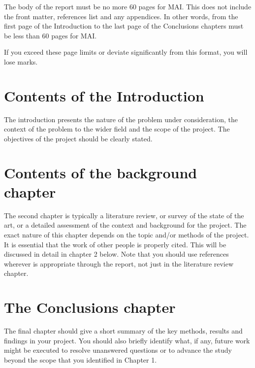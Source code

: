 The body of the report must be no more 60 pages for MAI. This does not include the front matter, references list and any appendices. In other words, from the first page of the Introduction to the last page of the Conclusions chapters must be less than 60 pages for MAI.

If you exceed these page limits or deviate significantly from this format, you will lose marks.

\section{Contents of the Introduction}
The introduction presents the nature of the problem under consideration, the context of the problem to the wider field and the scope of the project. The objectives of the project should be clearly stated.

\section{Contents of the background chapter}
The second chapter is typically a literature review, or survey of the state of the art, or a detailed assessment of the context and background for the project. The exact nature of this chapter depends on the topic and/or methods of the project. It is essential that the work of other people is properly cited. This will be discussed in detail in chapter 2 below. Note that you should use references wherever is appropriate through the report, not just in the literature review chapter.

\section{The Conclusions chapter}
The final chapter should give a short summary of the key methods, results and findings in your project. You should also briefly identify what, if any, future work might be executed to resolve unanswered questions or to advance the study beyond the scope that you identified in Chapter 1.

